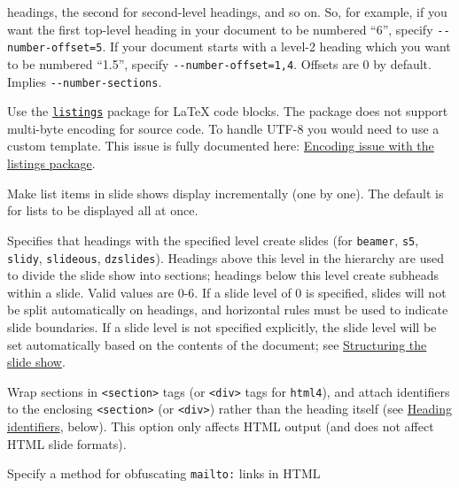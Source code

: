 \documentclass[
  a4paper,
]{article}
\begin{document}
\begin{description}
headings, the second for second-level headings, and so on. So, for
example, if you want the first top-level heading in your document to be
numbered ``6'', specify \texttt{-\/-number-offset=5}. If your document
starts with a level-2 heading which you want to be numbered ``1.5'',
specify \texttt{-\/-number-offset=1,4}. Offsets are 0 by default.
Implies \texttt{-\/-number-sections}.
\item[\texttt{-\/-listings{[}=true\textbar{}false{]}}]
Use the \href{https://ctan.org/pkg/listings}{\texttt{listings}} package
for LaTeX code blocks. The package does not support multi-byte encoding
for source code. To handle UTF-8 you would need to use a custom
template. This issue is fully documented here:
\href{https://en.wikibooks.org/wiki/LaTeX/Source_Code_Listings\#Encoding_issue}{Encoding
issue with the listings package}.
\item[\texttt{-i}, \texttt{-\/-incremental{[}=true\textbar{}false{]}}]
Make list items in slide shows display incrementally (one by one). The
default is for lists to be displayed all at once.
\item[\texttt{-\/-slide-level=}\emph{NUMBER}]
Specifies that headings with the specified level create slides (for
\texttt{beamer}, \texttt{s5}, \texttt{slidy}, \texttt{slideous},
\texttt{dzslides}). Headings above this level in the hierarchy are used
to divide the slide show into sections; headings below this level create
subheads within a slide. Valid values are 0-6. If a slide level of 0 is
specified, slides will not be split automatically on headings, and
horizontal rules must be used to indicate slide boundaries. If a slide
level is not specified explicitly, the slide level will be set
automatically based on the contents of the document; see
\protect\hyperlink{structuring-the-slide-show}{Structuring the slide
show}.
\item[\texttt{-\/-section-divs{[}=true\textbar{}false{]}}]
Wrap sections in \texttt{\textless{}section\textgreater{}} tags (or
\texttt{\textless{}div\textgreater{}} tags for \texttt{html4}), and
attach identifiers to the enclosing
\texttt{\textless{}section\textgreater{}} (or
\texttt{\textless{}div\textgreater{}}) rather than the heading itself
(see \protect\hyperlink{heading-identifiers}{Heading identifiers},
below). This option only affects HTML output (and does not affect HTML
slide formats).
\item[\texttt{-\/-email-obfuscation=none}\textbar{}\texttt{javascript}\textbar{}\texttt{references}]
Specify a method for obfuscating \texttt{mailto:} links in HTML

\end{description}
\end{document}
